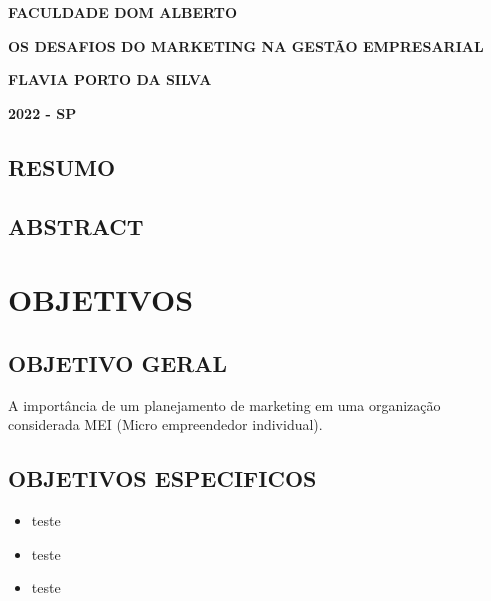 \documentclass[a4paper,12pt]{article}
\begin{document}
\begin{center}
   \textbf{
      FACULDADE DOM ALBERTO\\ %
   }

   \vspace{7cm}

   \textbf{
      OS DESAFIOS DO MARKETING NA GESTÃO EMPRESARIAL\\ %
   }

   \vspace{5cm}

   \textbf{
      FLAVIA PORTO DA SILVA\\ %
   }

   \vspace{10cm}

   \textbf{
      2022 \-- SP %
   }
\end{center}
   \newpage
   \begin{center}
      \section*{RESUMO}
   \end{center}

   \newpage
   \begin{center}
      \section*{ABSTRACT}
   \end{center}

   \pagebreak
   \section{OBJETIVOS}

   \subsection{OBJETIVO GERAL}
   A importância de um planejamento de marketing em uma organização considerada
   MEI (Micro empreendedor individual).

   \subsection{OBJETIVOS ESPECIFICOS}
   \begin{itemize}
      \item teste
      \item teste
      \item teste
   \end{itemize}
   \pagebreak
\end{document}
